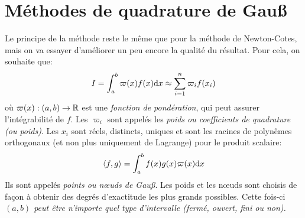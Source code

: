 \section{Méthodes de quadrature de Gauß} 
Le principe de la méthode reste le même que pour la méthode de Newton-Cotes, mais on va essayer d'améliorer un peu encore la qualité du résultat. Pour cela, on souhaite que: 
\begin{equation}
I=\int_a^b \varpi(x)f(x)\text{d} x \approx \sum_{i=1}^n \varpi_if(x_i)
\end{equation}
où $\varpi(x): (a,b)\rightarrow\mathbb R$ est une \emph{fonction de pondération}, qui peut assurer l'intégrabilité de $f$. Les $\varpi_i$ sont appelés les \emph{poids ou coefficients de quadrature (ou poids)}. Les $x_i$ sont réels, distincts, uniques et sont les racines de polynêmes orthogonaux (et non plus uniquement de Lagrange) pour le produit scalaire:
\begin{equation}
\left\langle f,g \right\rangle = \int_a^b f(x)g(x) \varpi(x) \text{d} x
\end{equation}
Ils sont appelés \emph{points ou nœuds de Gauß}. Les poids et les nœuds sont choisis de façon à obtenir des degrés d'exactitude les plus grands possibles. Cette fois-ci \emph{$(a,b)$ peut être n'importe quel type d'intervalle (fermé, ouvert, fini ou non).} 

